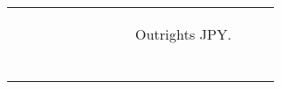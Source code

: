 \documentclass[a4paper,twoside]{report}
\begin{document}
 
\begin{figure}[htbp]
 \begin{tabular}[c]{cc}
 \begin{subfigure}[c]{0.5\textwidth}
 
 \end{subfigure}&
 \begin{subfigure}[c]{0.5\textwidth}
 \caption{Outrights JPY.}
 \label{fig:Outrights JPY}
 
 \null\hfill
 \end{subfigure}\\
 
 
 \begin{subfigure}[c]{0.5\textwidth}
 
 \null\hfill
 \end{subfigure}&
 

\end{tabular}
\end{figure}
\end{document}
